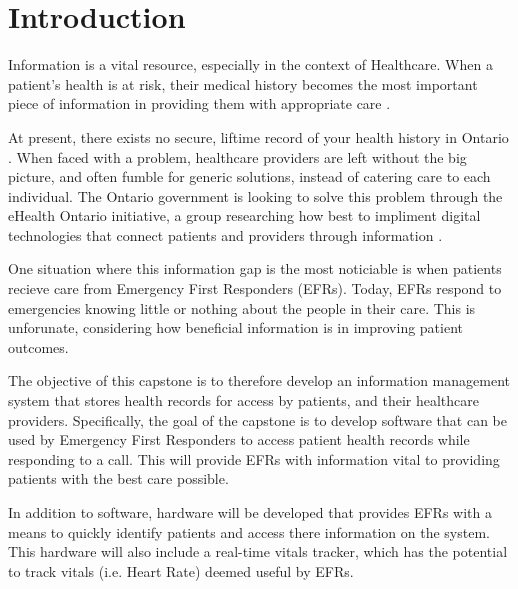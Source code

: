 
\section{Introduction}

Information is a vital resource, especially in the context of Healthcare. When a patient's health is at risk, their medical history becomes the most important piece of information in providing them with appropriate care \cite{web1}.

At present, there exists no secure, liftime record of your health history in Ontario \cite{Street2014}. When faced with a problem, healthcare providers are left without the big picture, and often fumble for generic solutions, instead of catering care to each individual. The Ontario government is looking to solve this problem through the eHealth Ontario initiative, a group researching how best to impliment digital technologies that connect patients and providers through information \cite{web1}.

One situation where this information gap is the most noticiable is when patients recieve care from Emergency First Responders (EFRs). Today, EFRs respond to emergencies knowing little or nothing about the people in their care. This is unforunate, considering how beneficial information is in improving patient outcomes. \iffalse For example, nursing homes often carry documents that contain health information on their residents. This information, including medications, allergies and diagonsed disorders gives EFRs an important base-knowledge for how assessing a patient. \fi

The objective of this capstone is to therefore develop an information management system that stores health records for access by patients, and their healthcare providers. Specifically, the goal of the capstone is to develop software that can be used by Emergency First Responders to access patient health records while responding to a call. This will provide EFRs with information vital to providing patients with the best care possible.

In addition to software, hardware will be developed that provides EFRs with a means to quickly identify patients and access there information on the system. This hardware will also include a real-time vitals tracker, which has the potential to track vitals (i.e. Heart Rate) deemed useful by EFRs.
